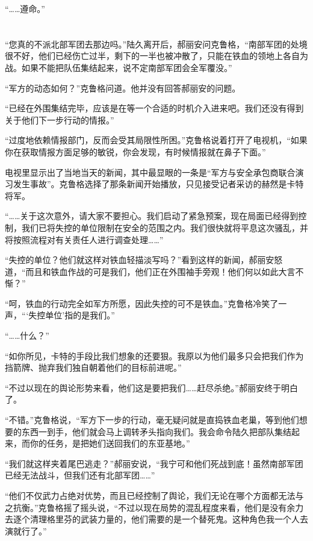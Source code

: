 “……遵命。”

\section*{}

“您真的不派北部军团去那边吗。”陆久离开后，郝丽安问克鲁格，“南部军团的处境很不好，他们已经伤亡过半，剩下的一半也被冲散了，只能在铁血的领地上各自为战。如果不能把队伍集结起来，说不定南部军团会全军覆没。”

“军方的动态如何？”克鲁格问道。他并没有回答郝丽安的问题。

“已经在外围集结完毕，应该是在等一个合适的时机介入进来吧。我们还没有得到关于他们下一步行动的情报。”

“过度地依赖情报部门，反而会受其局限性所困。”克鲁格说着打开了电视机，“如果你在获取情报方面足够的敏锐，你会发现，有时候情报就在鼻子下面。”

电视里显示出了当地当天的新闻，其中最显眼的一条是“军方与安全承包商联合演习发生事故”。克鲁格选择了那条新闻开始播放，只见接受记者采访的赫然是卡特将军。

“……关于这次意外，请大家不要担心。我们启动了紧急预案，现在局面已经得到控制，我们已将失控的单位限制在安全的范围之内。我们很快就将平息这次骚乱，并将按照流程对有关责任人进行调查处理……”

“失控的单位？他们就这样对铁血轻描淡写吗？”看到这样的新闻，郝丽安怒道，“而且和铁血作战的可是我们，他们正在外围袖手旁观！他们何以如此大言不惭？”

“呵，铁血的行动完全如军方所愿，因此失控的可不是铁血。”克鲁格冷笑了一声，“‘失控单位’指的是我们。”

“……什么？”

“如你所见，卡特的手段比我们想象的还要狠。我原以为他们最多只会把我们作为挡箭牌、抛弃我们独自朝着他们的目标前进呢。”

“不过以现在的舆论形势来看，他们这是要把我们……赶尽杀绝。”郝丽安终于明白了。

“不错。”克鲁格说，“军方下一步的行动，毫无疑问就是直捣铁血老巢，等到他们想要的东西一到手，他们就会马上调转矛头指向我们。我会命令陆久把部队集结起来，而你的任务，是把她们送回我们的东亚基地。”

“我们就这样夹着尾巴逃走？”郝丽安说，“我宁可和他们死战到底！虽然南部军团已经无法战斗，但我们还有北部军团……”

“他们不仅武力占绝对优势，而且已经控制了舆论，我们无论在哪个方面都无法与之抗衡。”克鲁格摇了摇头说，“不过以现在局势的混乱程度来看，他们是没有余力去逐个清理格里芬的武装力量的，他们需要的是一个替死鬼。这种角色我一个人去演就行了。”


